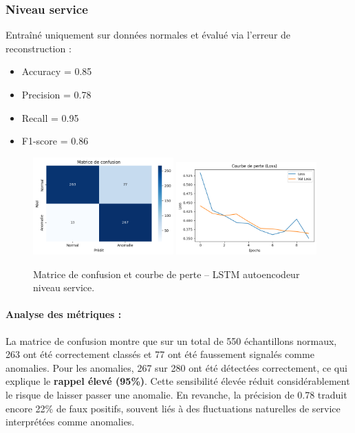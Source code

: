 \documentclass[a4paper,12pt]{report}
\begin{document}
\subsubsection*{Niveau service}

Entraîné uniquement sur données normales et évalué via l’erreur de reconstruction :

\begin{itemize}
    \item Accuracy = 0.85
    \item Precision = 0.78
    \item Recall = 0.95
    \item F1-score = 0.86
\end{itemize}

\begin{figure}[H]
    \centering
    \includegraphics[width=0.48\textwidth]{images/confusion_matrix_lstm_service.png}
    \includegraphics[width=0.48\textwidth]{images/loss_curve_lstm_service.png}
    \caption{Matrice de confusion et courbe de perte – LSTM autoencodeur niveau service.}
\end{figure}

\paragraph{Analyse des métriques :}
La matrice de confusion montre que sur un total de 550 échantillons normaux, 263 ont été correctement classés et 77 ont été faussement signalés comme anomalies.  
Pour les anomalies, 267 sur 280 ont été détectées correctement, ce qui explique le \textbf{rappel élevé (95\%)}.  
Cette sensibilité élevée réduit considérablement le risque de laisser passer une anomalie.  
En revanche, la précision de 0.78 traduit encore 22\% de faux positifs, souvent liés à des fluctuations naturelles de service interprétées comme anomalies.
\end{document}
